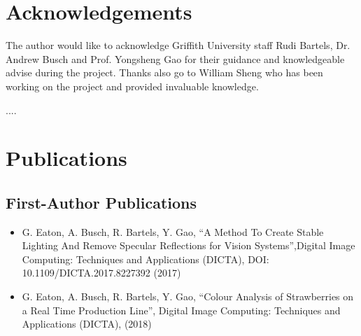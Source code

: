 \documentclass[fleqn,twoside]{article}
\begin{document}
\section*{Acknowledgements}


The author would like to acknowledge Griffith University staff Rudi Bartels, Dr. Andrew Busch and Prof. Yongsheng Gao for their guidance and knowledgeable advise during the project. Thanks also go to William Sheng who has been working on the project and provided invaluable knowledge.

....

\vspace*{\fill}%



\newpage

\section*{Publications}


\subsection{First-Author Publications}

\begin{itemize}
	\item{G. Eaton, A. Busch, R. Bartels, Y. Gao, “A Method To Create Stable Lighting And Remove Specular Reflections for Vision Systems”,Digital Image Computing: Techniques and Applications (DICTA), DOI: 10.1109/DICTA.2017.8227392 (2017)}
	\item{G. Eaton, A. Busch, R. Bartels, Y. Gao, “Colour Analysis of Strawberries on a Real Time Production Line”, Digital Image Computing: Techniques and Applications (DICTA), (2018)}
\end{itemize}  



\vspace*{\fill}%

\end{document}
